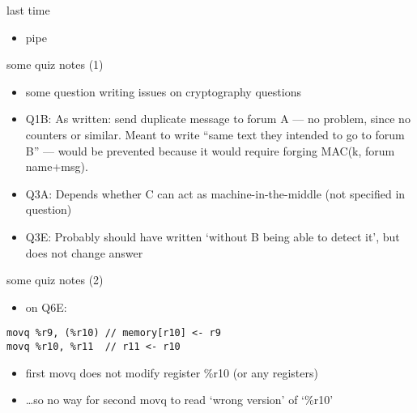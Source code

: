 \date{}
\title{}
\date{}

\begin{frame}
    \titlepage
\end{frame}


\usetikzlibrary{circuits.logic.mux}





\begin{frame}{last time}
    \begin{itemize}
    \item pipe
    \end{itemize}
\end{frame}

\begin{frame}{some quiz notes (1)}
    \begin{itemize}
    \item some question writing issues on cryptography questions
    \vspace{.5cm}
    \item Q1B: As written: send duplicate message to forum A --- no problem, since no counters or similar. Meant to write ``same text they intended to go to forum B'' --- would be prevented because it would require forging MAC(k, forum name+msg).
    \item Q3A: Depends whether C can act as machine-in-the-middle (not specified in question)
    \item Q3E: Probably should have written `without B being able to detect it', but does not change answer
    \end{itemize}
\end{frame}

\begin{frame}[fragile]{some quiz notes (2)}
    \begin{itemize}
    \item on Q6E:
    \end{itemize}
\begin{Verbatim}
movq %r9, (%r10) // memory[r10] <- r9
movq %r10, %r11  // r11 <- r10
\end{Verbatim}
    \begin{itemize}
    \item first movq does not modify register \%r10 (or any registers)
    \item \ldots so no way for second movq to read `wrong version' of `\%r10'
    \end{itemize}
\end{frame}


